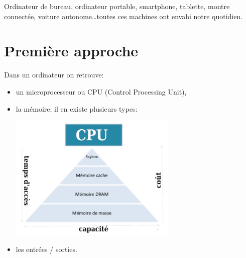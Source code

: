 \documentclass[a4paper,11pt]{article}
\begin{document}
Ordinateur de bureau, ordinateur portable, smartphone, tablette, montre connectée, voiture autonome\dots toutes ces machines ont envahi notre quotidien.
\begin{center}
\end{center}
\section{Première approche}
Dans un ordinateur on retrouve:
\begin{itemize}
    \item un microprocesseur ou CPU (Control Processing Unit),
    \item la mémoire; il en existe plusieurs types:
    \begin{center}
        \centering
        \includegraphics[width=8cm]{ressources/memoires.jpg}
        \end{center}
    \item les entrées / sorties.
\end{itemize}
\end{document}
